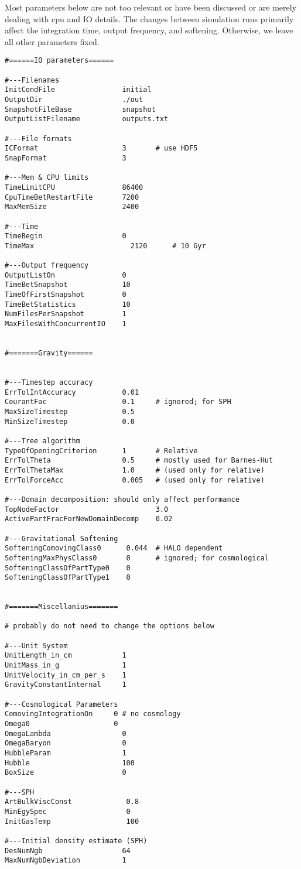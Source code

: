 Most parameters below are not too relevant or have been discussed or are
merely dealing with cpu and IO details. The changes between simulation
runs primarily affect the integration time, output frequency, and
softening. Otherwise, we leave all other parameters fixed.

\begin{verbatim}
#======IO parameters======

#---Filenames
InitCondFile                initial
OutputDir                   ./out
SnapshotFileBase            snapshot
OutputListFilename          outputs.txt

#---File formats 
ICFormat                    3       # use HDF5
SnapFormat                  3 

#---Mem & CPU limits
TimeLimitCPU                86400
CpuTimeBetRestartFile       7200
MaxMemSize                  2400

#---Time
TimeBegin                   0
TimeMax                       2120      # 10 Gyr

#---Output frequency
OutputListOn                0
TimeBetSnapshot             10
TimeOfFirstSnapshot         0 
TimeBetStatistics           10
NumFilesPerSnapshot         1
MaxFilesWithConcurrentIO    1 


#=======Gravity======


#---Timestep accuracy
ErrTolIntAccuracy           0.01
CourantFac                  0.1     # ignored; for SPH
MaxSizeTimestep             0.5
MinSizeTimestep             0.0 

#---Tree algorithm
TypeOfOpeningCriterion      1       # Relative
ErrTolTheta                 0.5     # mostly used for Barnes-Hut
ErrTolThetaMax              1.0     # (used only for relative)
ErrTolForceAcc              0.005   # (used only for relative)

#---Domain decomposition: should only affect performance
TopNodeFactor                       3.0
ActivePartFracForNewDomainDecomp    0.02

#---Gravitational Softening
SofteningComovingClass0      0.044  # HALO dependent
SofteningMaxPhysClass0       0      # ignored; for cosmological
SofteningClassOfPartType0    0
SofteningClassOfPartType1    0


#=======Miscellanius=======

# probably do not need to change the options below 

#---Unit System
UnitLength_in_cm            1 
UnitMass_in_g               1
UnitVelocity_in_cm_per_s    1 
GravityConstantInternal     1

#---Cosmological Parameters 
ComovingIntegrationOn     0 # no cosmology
Omega0                    0
OmegaLambda                 0 
OmegaBaryon                 0
HubbleParam                 1
Hubble                      100
BoxSize                     0

#---SPH
ArtBulkViscConst             0.8
MinEgySpec                   0
InitGasTemp                  100

#---Initial density estimate (SPH)
DesNumNgb                   64
MaxNumNgbDeviation          1
\end{verbatim}
